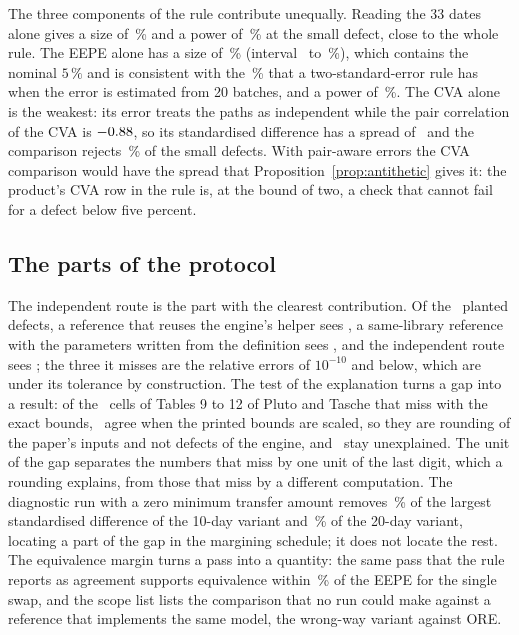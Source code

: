 The three components of the rule contribute unequally. Reading the 33 dates alone gives a size of \nSizeDatesNetting\,\% and a power of \nPowerDatesSigmaTwo\,\% at the small defect, close to the whole rule. The EEPE alone has a size of \nSizeEepeNetting\,\% (interval \nSizeEepeNettingLo\ to \nSizeEepeNettingHi\,\%), which contains the nominal $5\,\%$ and is consistent with the \nTtestSize\,\% that a two-standard-error rule has when the error is estimated from 20 batches, and a power of \nPowerEepeSigmaTwo\,\%. The CVA alone is the weakest: its error treats the paths as independent while the pair correlation of the CVA is $-0.88$, so its standardised difference has a spread of \nSdCvaNetting\ and the comparison rejects \nPowerCvaSigmaTwo\,\% of the small defects. With pair-aware errors the CVA comparison would have the spread that Proposition~\ref{prop:antithetic} gives it: the product's CVA row in the rule is, at the bound of two, a check that cannot fail for a defect below five percent.

\subsection{The parts of the protocol}
\label{sec:ablation-protocol}



The independent route is the part with the clearest contribution. Of the \nPlantedDefects\ planted defects, a reference that reuses the engine's helper sees \nPlantedCone, a same-library reference with the parameters written from the definition sees \nPlantedCtwo, and the independent route sees \nPlantedCthree; the three it misses are the relative errors of $10^{-10}$ and below, which are under its tolerance by construction. The test of the explanation turns a gap into a result: of the \nScaledGapsExact\ cells of Tables 9 to 12 of Pluto and Tasche that miss with the exact bounds, \nScaledGapsResolved\ agree when the printed bounds are scaled, so they are rounding of the paper's inputs and not defects of the engine, and \nScaledGapsLeft\ stay unexplained. The unit of the gap separates the numbers that miss by one unit of the last digit, which a rounding explains, from those that miss by a different computation. The diagnostic run with a zero minimum transfer amount removes \nMtaShareTen\,\% of the largest standardised difference of the 10-day variant and \nMtaShareTwenty\,\% of the 20-day variant, locating a part of the gap in the margining schedule; it does not locate the rest. The equivalence margin turns a pass into a quantity: the same pass that the rule reports as agreement supports equivalence within \nSingleEquivalence\,\% of the EEPE for the single swap, and the scope list lists the comparison that no run could make against a reference that implements the same model, the wrong-way variant against ORE.
